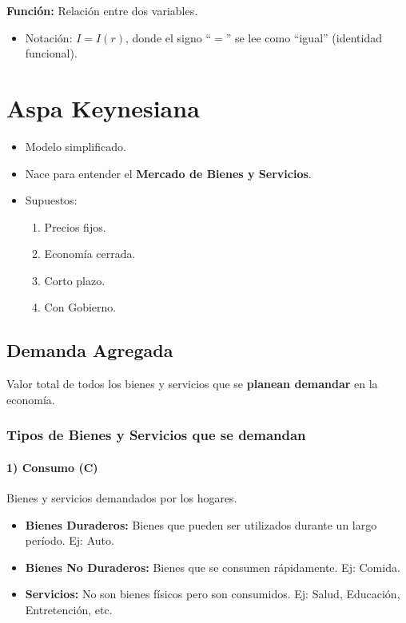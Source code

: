 \documentclass[11pt,a4paper]{article}
\begin{document}
\textbf{Función:} Relación entre dos variables.
\begin{itemize}
    \item Notación: $I = I(r)$, donde el signo ``$=$'' se lee como ``igual'' (identidad funcional).
\end{itemize}

\section{Aspa Keynesiana}

\begin{itemize}
    \item Modelo simplificado.
    \item Nace para entender el \textbf{Mercado de Bienes y Servicios}.
    \item Supuestos:
    \begin{enumerate}
        \item Precios fijos.
        \item Economía cerrada.
        \item Corto plazo.
        \item Con Gobierno.
    \end{enumerate}
\end{itemize}

\subsection{Demanda Agregada}

\begin{definicionbox}
Valor total de todos los bienes y servicios que se \textbf{planean demandar} en la economía.
\end{definicionbox}

\subsubsection{Tipos de Bienes y Servicios que se demandan}

\paragraph{1) Consumo (C)}
Bienes y servicios demandados por los hogares.
\begin{itemize}
    \item \textbf{Bienes Duraderos:} Bienes que pueden ser utilizados durante un largo período. Ej: Auto.
    \item \textbf{Bienes No Duraderos:} Bienes que se consumen rápidamente. Ej: Comida.
    \item \textbf{Servicios:} No son bienes físicos pero son consumidos. Ej: Salud, Educación, Entretención, etc.
\end{itemize}
\end{document}
